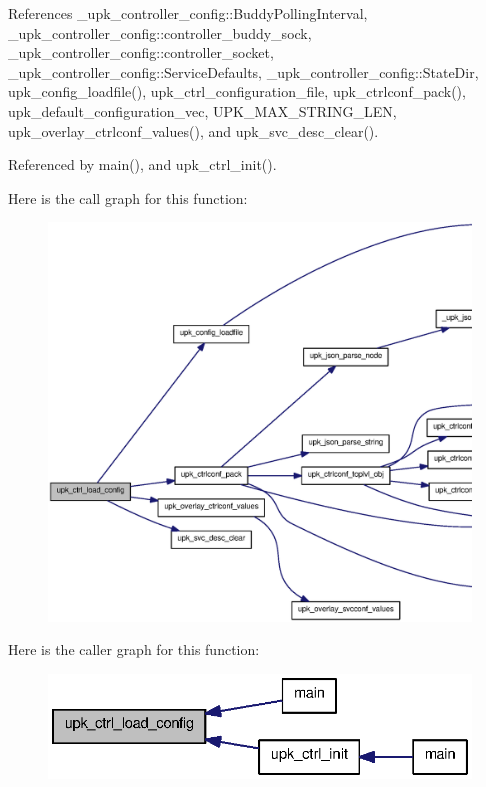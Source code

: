 References \_\-upk\_\-controller\_\-config::BuddyPollingInterval, \_\-upk\_\-controller\_\-config::controller\_\-buddy\_\-sock, \_\-upk\_\-controller\_\-config::controller\_\-socket, \_\-upk\_\-controller\_\-config::ServiceDefaults, \_\-upk\_\-controller\_\-config::StateDir, upk\_\-config\_\-loadfile(), upk\_\-ctrl\_\-configuration\_\-file, upk\_\-ctrlconf\_\-pack(), upk\_\-default\_\-configuration\_\-vec, UPK\_\-MAX\_\-STRING\_\-LEN, upk\_\-overlay\_\-ctrlconf\_\-values(), and upk\_\-svc\_\-desc\_\-clear().



Referenced by main(), and upk\_\-ctrl\_\-init().



Here is the call graph for this function:
\nopagebreak
\begin{figure}[H]
\begin{center}
\leavevmode
\includegraphics[width=400pt]{group__functions_ga11c5a55e854fb56c864a12ef5d314798_cgraph}
\end{center}
\end{figure}




Here is the caller graph for this function:\nopagebreak
\begin{figure}[H]
\begin{center}
\leavevmode
\includegraphics[width=330pt]{group__functions_ga11c5a55e854fb56c864a12ef5d314798_icgraph}
\end{center}
\end{figure}


